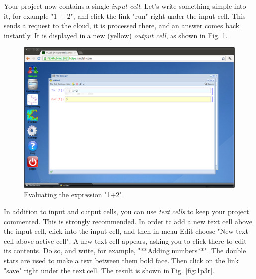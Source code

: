 \documentclass[article,A4,12pt]{llncs}
\begin{document}
Your project now contains a single {\em input cell}. Let's write 
something simple into it, for example "1 + 2", and click 
the link "run" right under the input cell. This sends a request to 
the cloud, it is processed there, and an answer comes back instantly. 
It is displayed in a new (yellow) {\em output cell}, as shown in 
Fig. \ref{fig:1p3}.

\newpage
\begin{figure}[!ht]
\begin{center}
\includegraphics[width=\textwidth]{img/1p3.png}
\end{center}
\caption{Evaluating the expression "1+2".}
\label{fig:1p3}
\end{figure}
\noindent
\noindent
In addition to input and output cells, you can use {\em text cells}
to keep your project commented. This is strongly recommended. In
order to add a new text cell above the input cell, click into
the input cell, and then in menu Edit choose "New text cell above
active cell". A new text cell appears, asking you to click there to
edit its contents. Do so, and write, for example, "**Adding numbers**".
The double stars are used to make a text between them bold face. 
Then click on the link "save" right under the text cell. The result 
is shown in Fig. \ref{fig:1p3r}.
\end{document}
